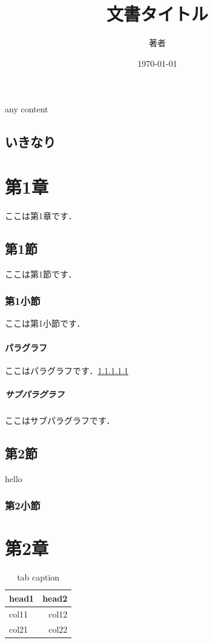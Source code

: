 \documentclass[a4paper,11pt]{jarticle}
\title{文書タイトル}
\author{著者}
\date{\today}
\begin{document}
    \maketitle

    \clearpage
    \tableofcontents

    \begin{table}
        any content
    \end{table}

    \clearpage
    \subsection{いきなり}
    \clearpage
    \section{第1章}
        ここは第1章です．
        \subsection{第1節}
            ここは第1節です．
            \subsubsection{第1小節}
                ここは第1小節です．
                \paragraph{パラグラフ}
                    ここはパラグラフです．\ref{sec:subparagraph}
                    \subparagraph{サブパラグラフ}
                        \label{sec:subparagraph}
                        ここはサブパラグラフです．
        \subsection{第2節}hello\subsubsection{第2小節}\quad

    \cleardoublepage
    \section{第2章}
        \begin{table}[h]
            \centering
            \caption{tab caption}
            \begin{tabular}{lr} \hline
                head1 & head2 \\\hline
                col11 & col12 \\
                col21 & col22 \\\hline
            \end{tabular}
            \label{tab:table}
        \end{table}
\end{document}

